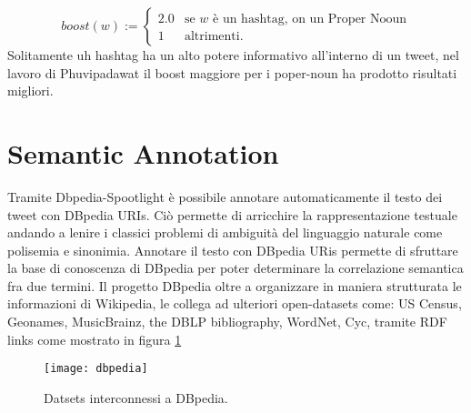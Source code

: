 \begin{equation*}
boost(w):=\begin{cases}
2.0 & \text{se $w$ è un hashtag, on un Proper Nooun}\\
1& \text{altrimenti.}
\end{cases}
\end{equation*}
Solitamente uh hashtag ha un alto potere informativo all’interno di un tweet, nel lavoro di  Phuvipadawat \cite{Phuvipadawat:2010:BND:1913791.1913911}  il boost maggiore per i poper-noun ha prodotto risultati migliori.

\newpage
\section{Semantic Annotation}
Tramite Dbpedia-Spootlight \cite{isem2013daiber} è possibile annotare automaticamente il testo dei tweet con DBpedia URIs.  Ciò permette di arricchire la rappresentazione testuale andando a lenire i classici problemi di ambiguità del linguaggio naturale come polisemia e sinonimia.  
Annotare il testo con DBpedia URis permette di sfruttare la base di conoscenza di DBpedia per poter determinare la correlazione semantica fra due termini. 
Il progetto DBpedia \cite{DBLP:conf/semweb/AuerBKLCI07} oltre a organizzare in maniera strutturata le informazioni di Wikipedia, le collega ad ulteriori open-datasets come: US Census, Geonames, MusicBrainz, the DBLP bibliography, WordNet, Cyc, tramite RDF links come mostrato in figura \ref{fig:dbpedia}  
\begin{figure}[h]
    \centering
    \texttt{[image: dbpedia]}
    \caption{Datsets interconnessi a DBpedia.}
    \label{fig:dbpedia}
\end{figure}  

